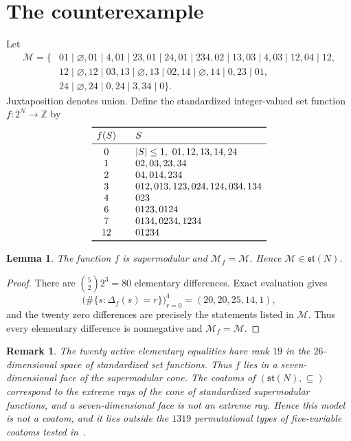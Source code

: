 \documentclass[11pt]{amsart}
\newtheorem{lemma}[theorem]{Lemma}
\newtheorem{remark}[theorem]{Remark}
\newcommand{\st}{\mathfrak{st}}
\newcommand{\M}{\mathcal{M}}
\begin{document}
\section{The counterexample}

Let
\begin{align*}
\M=\{&
01\mid\varnothing,
01\mid4,
01\mid23,
01\mid24,
01\mid234,
02\mid13,
03\mid4,
03\mid12,
04\mid12,\\
&12\mid\varnothing,
12\mid03,
13\mid\varnothing,
13\mid02,
14\mid\varnothing,
14\mid0,
23\mid01,\\
&24\mid\varnothing,
24\mid0,
24\mid3,
34\mid0
\}.
\end{align*}
Juxtaposition denotes union. Define the standardized integer-valued set
function $f\colon 2^N\to\mathbb Z$ by
\[
\begin{array}{c@{\qquad}l}
\toprule
f(S)&S\\
\midrule
0&|S|\leq1,\ 01,12,13,14,24\\
1&02,03,23,34\\
2&04,014,234\\
3&012,013,123,024,124,034,134\\
4&023\\
6&0123,0124\\
7&0134,0234,1234\\
12&01234\\
\bottomrule
\end{array}
\]

\begin{lemma}\label{lem:structural}
The function $f$ is supermodular and $\M_f=\M$. Hence $\M\in\st(N)$.
\end{lemma}

\begin{proof}
There are $\binom52 2^3=80$ elementary differences. Exact evaluation gives
\[
  \bigl(\#\{s:\Delta_f(s)=r\}\bigr)_{r=0}^{4}
  =(20,20,25,14,1),
\]
and the twenty zero differences are precisely the statements listed in
$\M$. Thus every elementary difference is nonnegative and $\M_f=\M$.
\end{proof}

\begin{remark}\label{rem:noncoatom}
The twenty active elementary equalities have rank $19$ in the
$26$-dimensional space of standardized set functions. Thus $f$ lies in a
seven-dimensional face of the supermodular cone. The coatoms of
$(\st(N),\subseteq)$ correspond to the extreme rays of the cone of
standardized supermodular functions, and a seven-dimensional face is not an
extreme ray. Hence this model is not a coatom, and it lies outside the
$1319$ permutational types of five-variable coatoms tested
in~\cite[Section~7.6]{BBS}.
\end{remark}
\end{document}
